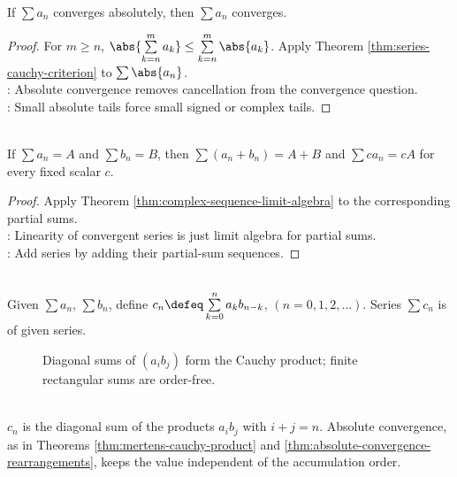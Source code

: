 \begin{theorem} \label{thm:absolute-convergence-implies-convergence} \\
If $\sum a_n$ converges absolutely, then $\sum a_n$ converges.
\begin{proof}
For $m\geq n$, $\abs{\sum\limits_{k=n}^{m}a_k}\leq\sum\limits_{k=n}^{m}\abs{a_k}$. Apply Theorem \ref{thm:series-cauchy-criterion} to $\sum\abs{a_n}$.\\
: Absolute convergence removes cancellation from the convergence question.\\
: Small absolute tails force small signed or complex tails.
\end{proof}
\end{theorem}

\begin{theorem} \label{thm:linearity-of-convergent-series} \\
If $\sum a_n=A$ and $\sum b_n=B$, then $\sum(a_n+b_n)=A+B$ and $\sum ca_n=cA$ for every fixed scalar $c$.
\begin{proof}
Apply Theorem \ref{thm:complex-sequence-limit-algebra} to the corresponding partial sums.\\
: Linearity of convergent series is just limit algebra for partial sums.\\
: Add series by adding their partial-sum sequences.
\end{proof}
\end{theorem}

\begin{definition} \label{def:cauchy-product-of-series} \\
Given $\sum a_n$, $\sum b_n$, define $c_n\defeq\sum\limits_{k=0}^{n}a_kb_{n-k}$, $(n=0,1,2,\ldots)$. Series $\sum c_n$ is  of given series.
\end{definition}

\begin{figure}[H]
  \centering
  
  \caption{Diagonal sums of $(a_i b_j)$ form the Cauchy product; finite rectangular sums are order-free.}
  \label{fig:cauchy-product-diagonals}
\end{figure}

\begin{perspective} \label{per:cauchy-product-diagonal-ordering} \\
$c_n$ is the diagonal sum of the products $a_i b_j$ with $i+j=n$. Absolute convergence, as in Theorems \ref{thm:mertens-cauchy-product} and \ref{thm:absolute-convergence-rearrangements}, keeps the value independent of the accumulation order.
\end{perspective}

